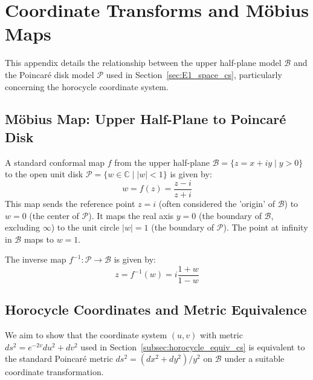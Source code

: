 \documentclass[12pt]{article}
\begin{document}
\section{Coordinate Transforms and Möbius Maps} %
\label{app:coords_mobius}

This appendix details the relationship between the upper half-plane model \( \mathcal{B} \) and the Poincaré disk model \( \mathcal{P} \) used in Section~\ref{sec:E1_space_cs}, %
particularly concerning the horocycle coordinate system.

\subsection{Möbius Map: Upper Half-Plane to Poincaré Disk}
\label{app:mobius_map}

A standard conformal map \( f \) from the upper half-plane \( \mathcal{B} = \{ z = x+iy \mid y > 0 \} \) to the open unit disk \( \mathcal{P} = \{ w \in \mathbb{C} \mid |w| < 1 \} \) is given by:
\[
w = f(z) = \frac{z - i}{z + i}
\]
This map sends the reference point \( z=i \) (often considered the 'origin' of \( \mathcal{B} \)) to \( w=0 \) (the center of \( \mathcal{P} \)). It maps the real axis \( y=0 \) (the boundary of \( \mathcal{B} \), excluding \( \infty \)) to the unit circle \( |w|=1 \) (the boundary of \( \mathcal{P} \)). The point at infinity in \( \mathcal{B} \) maps to \( w=1 \).

The inverse map \( f^{-1}: \mathcal{P} \to \mathcal{B} \) is given by:
\[
z = f^{-1}(w) = i \frac{1 + w}{1 - w}
\]

\subsection{Horocycle Coordinates and Metric Equivalence}
\label{app:horocycle_coords}

We aim to show that the coordinate system \( (u, v) \) with metric \( ds^2 = e^{-2v} du^2 + dv^2 \) used in Section~\ref{subsec:horocycle_equiv_cs} %
is equivalent to the standard Poincaré metric \( ds^2 = (dx^2 + dy^2) / y^2 \) on \( \mathcal{B} \) under a suitable coordinate transformation.
\end{document}
